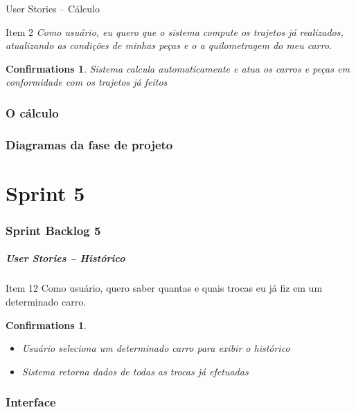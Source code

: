 \documentclass[hyperref={pdfpagelabels=false},11pt]{beamer}
\newtheorem{confirmations}[theorem]{Confirmations}
\begin{document}
			\begin{frame}{User Stories -- Cálculo}
				\begin{block}{Item 2}
					\emph{Como usuário, eu quero que o sistema compute os trajetos já realizados, atualizando as condições de minhas peças e o a quilometragem do meu carro.}
					\begin{confirmations}
						Sistema calcula automaticamente e atua os carros e peças em conformidade com os trajetos já feitos
					\end{confirmations}
				\end{block}
			\end{frame}
			
			
				 		
 		
		\section{O cálculo}
		\section{Diagramas da fase de projeto}
	\part{Sprint 5}
		\section{Sprint Backlog 5}
			\begin{frame}
				\frametitle{User Stories -- Histórico}
				\begin{block}{Item 12}
					Como usuário, quero saber quantas e quais trocas eu já fiz em um determinado carro.
					\begin{confirmations}
						\begin{itemize}
							\item{Usuário seleciona um determinado carro para exibir o histórico}
							\item{Sistema retorna dados de todas as trocas já efetuadas}
						\end{itemize}
					\end{confirmations}
				\end{block}
			\end{frame}		
		
		\section{Interface}
\end{document}
